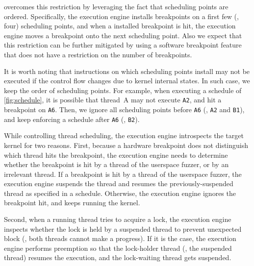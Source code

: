 \sys overcomes this restriction by leveraging the fact that scheduling
points are ordered. Specifically, the execution engine installs
breakpoints on a first few (\eg, four) scheduling points, and when a
installed breakpoint is hit, the execution engine moves a breakpoint
onto the next scheduling point.
%
Also we expect that this restriction can be further mitigated by using
a software breakpoint feature that does not have a restriction on the
number of breakpoints.



%
%




%
It is worth noting that instructions on which scheduling points
install may not be executed if the control flow changes due to kernel internal states.
%
\dr{}In such case, we keep the order of scheduling points.
%
For example, when executing a schedule of \autoref{fig:schedule}, it is possible that thread~A may not execute \texttt{A2}, and hit a breakpoint on \texttt{A6}.
%
Then, we ignore all scheduling points before \texttt{A6} (\ie, \texttt{A2} and \texttt{B1}), and keep
enforcing a schedule after \texttt{A6} (\ie, \texttt{B2}).



%
While controlling thread scheduling, the execution engine introspects
the target kernel for two reasons.
%
First, because a hardware breakpoint does not distinguish which thread
hits the breakpoint, the execution engine needs to determine whether
the breakpoint is hit by a thread of the userspace fuzzer, or by an
irrelevant thread.
%
If a breakpoint is hit by a thread of the userspace fuzzer, the
execution engine suspends the thread and resumes the
previously-suspended thread as specified in a schedule.
%
Otherwise, the execution engine ignores the breakpoint hit, and keeps
running the kernel.


Second, when a running thread tries to acquire a lock, the execution
engine inspects whether the lock is held by a suspended thread to
prevent unexpected block (\ie, both threads cannot make a progress).
%
If it is the case, the execution engine performs preemption so that
the lock-holder thread (\ie, the suspended thread) resumes the
execution, and the lock-waiting thread gets suspended.



